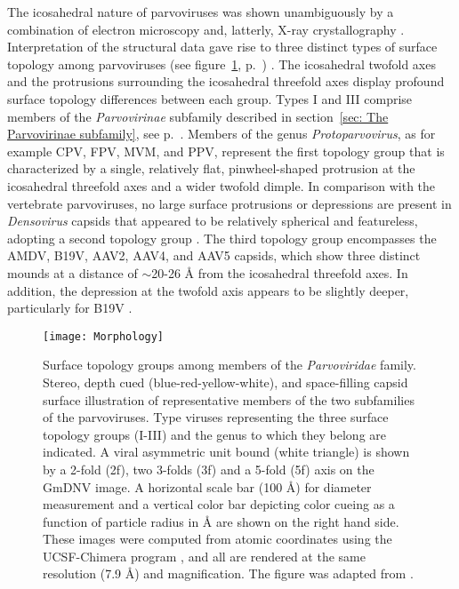 The icosahedral nature of parvoviruses was shown unambiguously by a combination of electron microscopy and, latterly, X-ray crystallography \cite{pmid2006420}. Interpretation of the structural data gave rise to three distinct types of surface topology among parvoviruses (see figure~\ref{Morphology}, p.~\pageref{Morphology}) \cite{pmid15795290}. The icosahedral twofold axes and the protrusions surrounding the icosahedral threefold axes display profound surface topology differences between each group. Types I and III comprise members of the \textit{Parvovirinae} subfamily described in section~\ref{sec: The Parvovirinae subfamily}, see p.~\pageref{sec: The Parvovirinae subfamily}. Members of the genus \textit{Protoparvovirus}, as for example CPV, FPV, MVM, and PPV, represent the first topology group that is characterized by a single, relatively flat, pinwheel-shaped protrusion at the icosahedral threefold axes and a wider twofold dimple. In comparison with the vertebrate parvoviruses, no large surface protrusions or depressions are present in \textit{Densovirus} capsids that appeared to be relatively spherical and featureless, adopting a second topology group \cite{pmid15769470, pmid9817847}. The third topology group encompasses the AMDV, B19V, AAV2, AAV4, and AAV5 capsids, which show three distinct mounds at a distance of $\sim$20-26 \r{A} from the icosahedral threefold axes. In addition, the depression at the twofold axis appears to be slightly deeper, particularly for B19V \cite{pmid20375175, pmid12136130, tropism}.        

\begin{figure}[h] 
\centering
\texttt{[image: Morphology]}
\caption[Parvovirus surface topology groups]{Surface topology groups among members of the \textit{Parvoviridae} family. Stereo, depth cued (blue-red-yellow-white), and space-filling capsid surface illustration of representative members of the two subfamilies of the parvoviruses. Type viruses representing the three surface topology groups (I-III) and the genus to which they belong are indicated. A viral asymmetric unit bound (white triangle) is shown by a 2-fold (2f), two 3-folds (3f) and a 5-fold (5f) axis on the GmDNV image. A horizontal scale bar (100 \r{A}) for diameter measurement and a vertical color bar depicting color cueing as a function of particle radius in \r{A} are shown on the right hand side. These images were computed from atomic coordinates using the UCSF-Chimera program \cite{pmid15264254}, and all are rendered at the same resolution (7.9 \r{A}) and magnification. The figure was adapted from \cite{pmid20375175}.}
\label{Morphology}
\end{figure}

